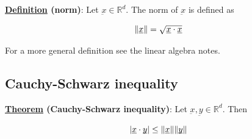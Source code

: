 \documentclass[10pt]{extarticle}
\newcommand{\R}{\mathbb{R}}
\newcommand{\munderbar}[1]{\underbar{\ensuremath{#1}}}
\begin{document}
\textbf{\underline{Definition} (norm)}: Let $\munderbar{x} \in \R^d$. The norm of $\munderbar{x}$ is defined as

$$
    \norm{\munderbar{x}} = \sqrt{\munderbar{x} \cdot \munderbar{x}}
$$

For a more general definition see the linear algebra notes.

\subsection{Cauchy-Schwarz inequality}

\textbf{\underline{Theorem} (Cauchy-Schwarz inequality)}: Let $\munderbar{x}, \munderbar{y} \in \R^d$. Then

$$
    \abs{\munderbar{x} \cdot \munderbar{y}} \leq \norm{\munderbar{x}} \norm{\munderbar{y}}
$$
\end{document}
